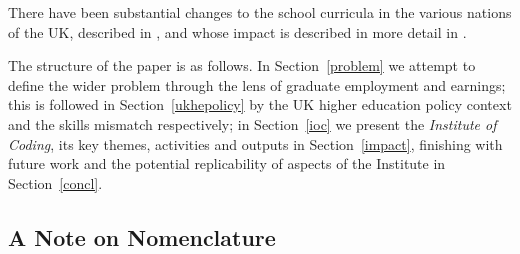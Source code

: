 \documentclass[conference]{IEEEtran}
\begin{document}
%

There have been substantial changes to the school curricula in the various nations of the UK, described in \cite{brown-et-al:toce2014}, and whose impact is described in more detail in \cite{davenport-et-al:cep2019}.

The structure of the paper is as follows. In Section~\ref{problem} we
attempt to define the wider problem through the lens of graduate
employment and earnings; this is followed in Section~\ref{ukhepolicy}
by the UK higher education policy context and the skills mismatch
respectively; in Section~\ref{ioc} we present the {\emph{Institute of
Coding}}, its key themes, activities and outputs in
Section~\ref{impact}, finishing with future work and the potential
replicability of aspects of the Institute in Section~\ref{concl}.


\subsection{A Note on Nomenclature}
\end{document}
